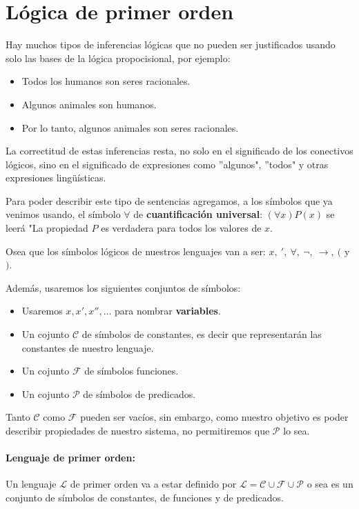 \section{Lógica de primer orden}
Hay muchos tipos de inferencias lógicas que no pueden ser justificados usando solo las bases de la lógica propocisional, por ejemplo:

\begin{itemize}
	\item Todos los humanos son seres racionales.
	\item Algunos animales son humanos.
	\item Por lo tanto, algunos animales son seres racionales.
\end{itemize}

La correctitud de estas inferencias resta, no solo en el significado de los conectivos lógicos, sino en el significado de expresiones como ''algunos", ''todos" y otras expresiones lingüísticas.

Para poder describir este tipo de sentencias agregamos, a los símbolos que ya venimos usando, el símbolo $\forall$ de \textbf{cuantificación universal}: $(\forall x) P(x)$ se leerá "La propiedad $P$ es verdadera para todos los valores de $x$.

Osea que los símbolos lógicos de nuestros lenguajes van a ser: $x,~',~\forall,~\lnot,~\to,~($ y $)$.

Además, usaremos los siguientes conjuntos de símbolos:
\begin{itemize}
	\item[] Usaremos $x, x', x'',\dots$ para nombrar \textbf{variables}.
	\item Un cojunto $\mathcal{C}$ de símbolos de constantes, es decir que representarán las constantes de nuestro lenguaje.
	\item Un cojunto $\mathcal{F}$ de símbolos funciones.
	\item Un cojunto $\mathcal{P}$ de símbolos de predicados.
\end{itemize}

Tanto $\mathcal{C}$ como $\mathcal{F}$ pueden ser vacíos, sin embargo, como nuestro objetivo es poder describir propiedades de nuestro sistema, no permitiremos que $\mathcal{P}$ lo sea.

\paragraph{Lenguaje de primer orden:} Un lenguaje $\mathcal{L}$ de primer orden va a estar definido por $\mathcal{L} = \mathcal{C}\cup\mathcal{F}\cup\mathcal{P}$ o sea es un conjunto de símbolos de constantes, de funciones y de predicados.

